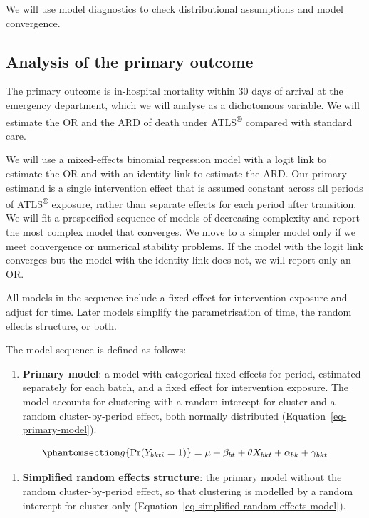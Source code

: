 \documentclass[
]{scrartcl}
\providecommand{\tightlist}{%
  \setlength{\itemsep}{0pt}\setlength{\parskip}{0pt}}\usepackage{longtable,booktabs,array}
\begin{document}
We will use model diagnostics to check distributional assumptions and
model convergence.

\subsection{Analysis of the primary
outcome}\label{sec-analysis-of-the-primary-outcome}

The primary outcome is in-hospital mortality within 30 days of arrival
at the emergency department, which we will analyse as a dichotomous
variable. We will estimate the OR and the ARD of death under
ATLS\textsuperscript{®} compared with standard care.

We will use a mixed-effects binomial regression model with a logit link
to estimate the OR and with an identity link to estimate the ARD. Our
primary estimand is a single intervention effect that is assumed
constant across all periods of ATLS\textsuperscript{®} exposure, rather
than separate effects for each period after transition. We will fit a
prespecified sequence of models of decreasing complexity and report the
most complex model that converges. We move to a simpler model only if we
meet convergence or numerical stability problems. If the model with the
logit link converges but the model with the identity link does not, we
will report only an OR.

All models in the sequence include a fixed effect for intervention
exposure and adjust for time. Later models simplify the parametrisation
of time, the random effects structure, or both.

The model sequence is defined as follows:

\begin{enumerate}
\def\labelenumi{\arabic{enumi}.}
\tightlist
\item
  \textbf{Primary model}: a model with categorical fixed effects for
  period, estimated separately for each batch, and a fixed effect for
  intervention exposure. The model accounts for clustering with a random
  intercept for cluster and a random cluster-by-period effect, both
  normally distributed (Equation~\ref{eq-primary-model}).
\end{enumerate}

\begin{equation}\phantomsection\label{eq-primary-model}{
g\{\Pr(Y_{bkti} = 1)\} = \mu + \beta_{bt} + \theta X_{bkt} + \alpha_{bk} + \gamma_{bkt}
}\end{equation}

\begin{enumerate}
\def\labelenumi{\arabic{enumi}.}
\setcounter{enumi}{1}
\tightlist
\item
  \textbf{Simplified random effects structure}: the primary model
  without the random cluster-by-period effect, so that clustering is
  modelled by a random intercept for cluster only
  (Equation~\ref{eq-simplified-random-effects-model}).
\end{enumerate}
\end{document}

